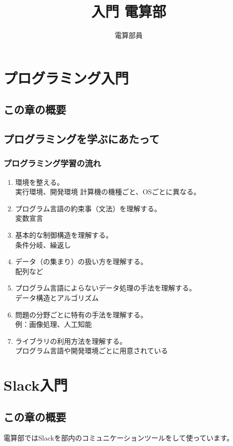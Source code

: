 \documentclass[lualatex,ja=standard,12pt,a4j]{bxjsbook}
\title{入門 電算部}
\author{電算部員}
\begin{document}
	\tableofcontents
	\chapter{プログラミング入門}
		\section{この章の概要}
		\section{プログラミングを学ぶにあたって}
			\subsection{プログラミング学習の流れ}
			\begin{enumerate}
				\item 環境を整える。\\
				実行環境、開発環境
				計算機の機種ごと、OSごとに異なる。
				
				\item プログラム言語の約束事（文法）を理解する。\\
				変数宣言
			
				\item 基本的な制御構造を理解する。\\
				条件分岐、繰返し
				
				\item データ（の集まり）の扱い方を理解する。\\
				配列など
				
				\item プログラム言語によらないデータ処理の手法を理解する。\\
				データ構造とアルゴリズム
				
				\item 問題の分野ごとに特有の手法を理解する。\\
				例：画像処理、人工知能
				
				\item ライブラリの利用方法を理解する。\\
				プログラム言語や開発環境ごとに用意されている
			\end{enumerate}
	\chapter{Slack入門}
		\section{この章の概要}
			電算部ではSlackを部内のコミュニケーションツールをして使っています。
\end{document}
